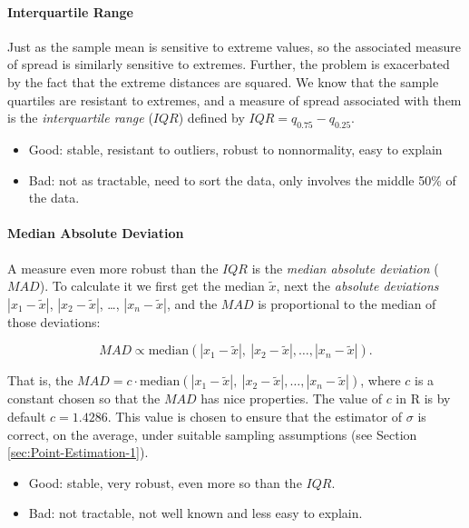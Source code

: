 \documentclass[captions=tableheading]{scrbook}
\begin{document}
\paragraph*{Interquartile Range}

Just as the sample mean is sensitive to extreme values, so the associated measure of spread is similarly sensitive to extremes. Further, the problem is exacerbated by the fact that the extreme distances are squared. We know that the sample quartiles are resistant to extremes, and a measure of spread associated with them is the \emph{interquartile range} (\(IQR\)) defined by \(IQR=q_{0.75}-q_{0.25}\).

\begin{itemize}
\item Good: stable, resistant to outliers, robust to nonnormality, easy to explain
\item Bad: not as tractable, need to sort the data, only involves the middle 50\% of the data.
\end{itemize}

\paragraph*{Median Absolute Deviation}

A measure even more robust than the \(IQR\) is the \emph{median absolute deviation} (\(MAD\)). To calculate it we first get the median \(\widetilde{x}\), next the \emph{absolute deviations} \(|x_{1}-\tilde{x}|\), \(|x_{2}-\tilde{x}|\), \ldots{}, \(|x_{n}-\tilde{x}|\), and the \(MAD\) is proportional to the median of those deviations:

\begin{equation}
MAD\propto\mbox{median}(|x_{1}-\tilde{x}|,\ |x_{2}-\tilde{x}|,\ldots,|x_{n}-\tilde{x}|).
\end{equation}

That is, the \(MAD=c\cdot\mbox{median}(|x_{1}-\tilde{x}|,\ |x_{2}-\tilde{x}|,\ldots,|x_{n}-\tilde{x}|)\), where \(c\) is a constant chosen so that the \(MAD\) has nice properties. The value of \(c\) in \textsf{R} is by default \(c=1.4286\). This value is chosen to ensure that the estimator of \(\sigma\) is correct, on the average, under suitable sampling assumptions (see Section \ref{sec:Point-Estimation-1}).

\begin{itemize}
\item Good: stable, very robust, even more so than the \(IQR\).
\item Bad: not tractable, not well known and less easy to explain.
\end{itemize}
\end{document}
